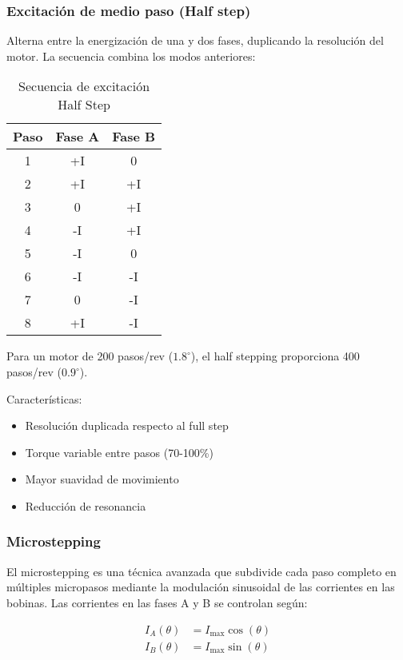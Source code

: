 \subsubsection{Excitación de medio paso (Half step)}

Alterna entre la energización de una y dos fases, duplicando la resolución del motor. La secuencia combina los modos anteriores:

\begin{table}[ht]
\centering
\begin{tabular}{|c|c|c|}
\hline
\textbf{Paso} & \textbf{Fase A} & \textbf{Fase B} \\
\hline
1 & +I & 0 \\
2 & +I & +I \\
3 & 0 & +I \\
4 & -I & +I \\
5 & -I & 0 \\
6 & -I & -I \\
7 & 0 & -I \\
8 & +I & -I \\
\hline
\end{tabular}
\caption{Secuencia de excitación Half Step}
\end{table}

Para un motor de 200 pasos/rev ($1.8^\circ$), el half stepping proporciona 400 pasos/rev ($0.9^\circ$).

Características:
\begin{itemize}
    \item Resolución duplicada respecto al full step
    \item Torque variable entre pasos (70-100\%)
    \item Mayor suavidad de movimiento
    \item Reducción de resonancia
\end{itemize}

\subsubsection{Microstepping}

El microstepping es una técnica avanzada que subdivide cada paso completo en múltiples micropasos mediante la modulación sinusoidal de las corrientes en las bobinas. Las corrientes en las fases A y B se controlan según:

\begin{equation}
\begin{aligned}
I_A(\theta) &= I_{\max} \cos(\theta) \\
I_B(\theta) &= I_{\max} \sin(\theta)
\end{aligned}
\end{equation}

